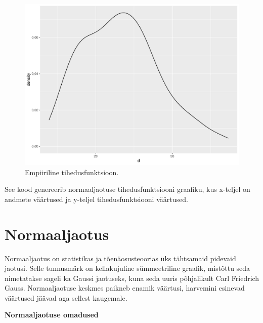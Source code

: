 \documentclass[
]{book}
\begin{document}
\begin{figure}
\includegraphics[width=0.8\linewidth]{_main_files/figure-latex/unnamed-chunk-39-1} \caption{Empiiriline tihedusfunktsioon.}\label{fig:unnamed-chunk-39}
\end{figure}

See kood genereerib normaaljaotuse tihedusfunktsiooni graafiku, kus x-teljel on andmete väärtused ja y-teljel tihedusfunktsiooni väärtused.

\section{Normaaljaotus}\label{normaaljaotus}

Normaaljaotus on statistikas ja tõenäosusteoorias üks tähtsamaid pidevaid jaotusi. Selle tunnusmärk on kellakujuline sümmeetriline graafik, mistõttu seda nimetatakse sageli ka Gaussi jaotuseks, kuna seda uuris põhjalikult Carl Friedrich Gauss. Normaaljaotuse keskmes paikneb enamik väärtusi, harvemini esinevad väärtused jäävad aga sellest kaugemale.

\textbf{Normaaljaotuse omadused}
\end{document}
